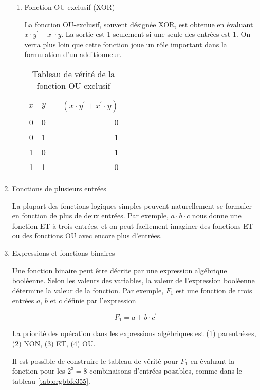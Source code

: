 \documentclass[letter, oneside]{book}
\begin{document}
\begin{enumerate}
\begin{enumerate}
\item Fonction OU-exclusif (XOR)
\label{sec:org7300df7}

La fonction OU-exclusif, souvent désignée XOR, est obtenue en évaluant
\(x \cdot y^\prime + x^\prime \cdot y\). La sortie est 1 seulement si
une seule des entrées est 1. On verra plus loin que cette fonction
joue un rôle important dans la formulation d'un additionneur.

\begin{table}[htbp]
\caption{\label{tab:org4a5588b}Tableau de vérité de la fonction OU-exclusif}
\centering
\begin{tabular}{rrlr}
\(x\) & \(y\) &  & \((x \cdot y^\prime + x^\prime \cdot y)\)\\[0pt]
\hline
0 & 0 &  & 0\\[0pt]
0 & 1 &  & 1\\[0pt]
1 & 0 &  & 1\\[0pt]
1 & 1 &  & 0\\[0pt]
\end{tabular}
\end{table}
\end{enumerate}

\item Fonctions de plusieurs entrées
\label{sec:orge1a331c}

La plupart des fonctions logiques simples peuvent naturellement se
formuler en fonction de plus de deux entrées. Par exemple, \(a \cdot b
\cdot c\) nous donne une fonction ET à trois entrées, et on peut
facilement imaginer des fonctions ET ou des fonctions OU avec encore
plus d'entrées.

\item Expressions et fonctions binaires
\label{sec:org5512ecb}

Une fonction binaire peut être décrite par une expression algébrique
booléenne. Selon les valeurs des variables, la valeur de l'expression
booléenne détermine la valeur de la fonction. Par exemple, \(F_1\) est
une fonction de trois entrées \(a\), \(b\) et \(c\) définie par
l'expression

$$ F_1 = a + b \cdot c^\prime $$

La priorité des opération dans les expressions algébriques est (1)
parenthèses, (2) NON, (3) ET, (4) OU.

Il est possible de construire le tableau de vérité pour \(F_1\) en
évaluant la fonction pour les \(2^3 = 8\) combinaisons d'entrées
possibles, comme dans le tableau \ref{tab:orgbbfc355}.


\end{enumerate}
\end{document}
